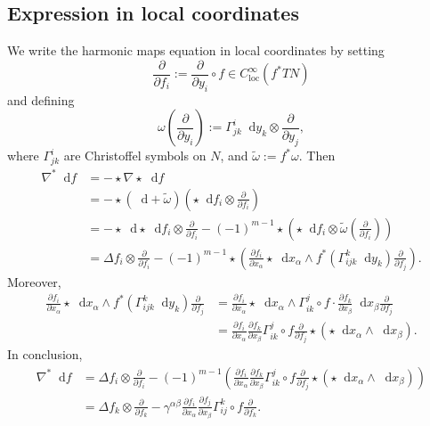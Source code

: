 \documentclass[reqno,12pt,letterpaper]{amsart}
\newcommand*\dif{\mathop{}\!\mathrm{d}}
\newcommand{\loc}{\mathrm{loc}}
\newcommand{\parl}{\left(}
\newcommand{\parr}{\right)}
\theoremstyle{definition}
\numberwithin{equation}{section}
\begin{document}
\subsection{Expression in local coordinates}
We write the harmonic maps equation in local coordinates by setting 
$$\frac{\partial}{\partial f_i} := \frac{\partial}{\partial y_i} \circ f \in C^\infty_\loc(f^* TN)$$
and defining
$$\omega\left(\frac{\partial}{\partial y_i}\right) := \Gamma_{jk}^i \dif y_k \otimes \frac{\partial}{\partial y_j},$$
where $\Gamma_{jk}^i$ are Christoffel symbols on $N$, and $\tilde \omega := f^* \omega$.
Then 
\begin{align*}
\nabla^* \dif f &= -\star \nabla \star \dif f \\
&= -\star (\dif + \tilde \omega)\parl\star \dif f_i \otimes \frac{\partial}{\partial f_i}\parr \\
&= - \star \dif \star \dif f_i \otimes \frac{\partial}{\partial f_i} - (-1)^{m - 1} \star\parl\star \dif f_i \otimes \tilde \omega\parl\frac{\partial}{\partial f_i}\parr\parr\\
&= \Delta f_i \otimes \frac{\partial}{\partial f_i} - (-1)^{m - 1} \star \parl \frac{\partial f_i}{\partial x_\alpha} \star \dif x_\alpha \wedge f^*(\Gamma_{ijk}^k \dif y_k) \frac{\partial}{\partial f_j}\parr.
\end{align*}
Moreover,
\begin{align*}
\frac{\partial f_i}{\partial x_\alpha} \star \dif x_\alpha \wedge f^*(\Gamma_{ijk}^k \dif y_k) \frac{\partial}{\partial f_j}
&= \frac{\partial f_i}{\partial x_\alpha} \star \dif x_\alpha \wedge \Gamma_{ik}^j \circ f \cdot \frac{\partial f_k}{\partial x_\beta} \dif x_\beta \frac{\partial}{\partial f_j} \\
&= \frac{\partial f_i}{\partial x_\alpha} \frac{\partial f_k}{\partial x_\beta} \Gamma_{ik}^j \circ f \frac{\partial}{\partial f_j} \star (\star \dif x_\alpha \wedge \dif x_\beta).
\end{align*}
In conclusion,
\begin{align*}
\nabla^* \dif f &= \Delta f_i \otimes \frac{\partial}{\partial f_i} - (-1)^{m - 1} \parl \frac{\partial f_i}{\partial x_\alpha} \frac{\partial f_k}{\partial x_\beta} \Gamma_{ik}^j \circ f \frac{\partial}{\partial f_j} \star (\star \dif x_\alpha \wedge \dif x_\beta) \parr \\
&= \Delta f_k \otimes \frac{\partial}{\partial f_k} - \gamma^{\alpha \beta} \frac{\partial f_i}{\partial x_\alpha} \frac{\partial f_j}{\partial x_\beta} \Gamma_{ij}^k \circ f \frac{\partial}{\partial f_k}.
\end{align*}
\end{document}
